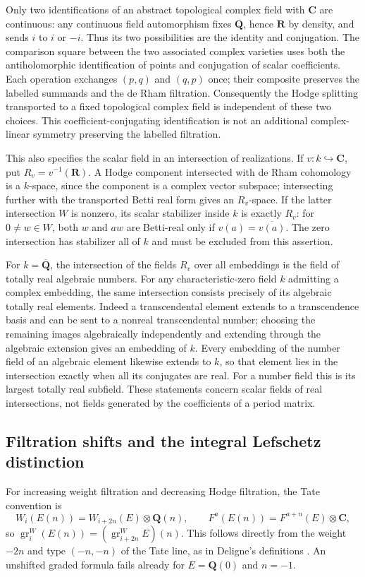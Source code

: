 \documentclass[11pt]{article}
\theoremstyle{definition}\newtheorem{definition}[theorem]{Definition}
\theoremstyle{remark}\newtheorem{remark}[theorem]{Remark}
\newcommand{\Q}{\mathbf Q}\newcommand{\Z}{\mathbf Z}
\newcommand{\R}{\mathbf R}\newcommand{\C}{\mathbf C}
\newcommand{\Qb}{\overline{\mathbf Q}}\newcommand{\Fp}{\mathbf F_p}
\DeclareMathOperator{\gr}{gr}\DeclareMathOperator{\GL}{GL}
\begin{document}
Only two identifications of an abstract topological complex field with $\C$ are continuous: any continuous field automorphism fixes $\Q$, hence $\R$ by density, and sends $i$ to $i$ or $-i$. Thus its two possibilities are the identity and conjugation. The comparison square between the two associated complex varieties uses both the antiholomorphic identification of points and conjugation of scalar coefficients. Each operation exchanges $(p,q)$ and $(q,p)$ once; their composite preserves the labelled summands and the de Rham filtration. Consequently the Hodge splitting transported to a fixed topological complex field is independent of these two choices. This coefficient-conjugating identification is not an additional complex-linear symmetry preserving the labelled filtration.

This also specifies the scalar field in an intersection of realizations. If $v:k\hookrightarrow\C$, put $R_v=v^{-1}(\R)$. A Hodge component intersected with de Rham cohomology is a $k$-space, since the component is a complex vector subspace; intersecting further with the transported Betti real form gives an $R_v$-space. If the latter intersection $W$ is nonzero, its scalar stabilizer inside $k$ is exactly $R_v$: for $0\ne w\in W$, both $w$ and $aw$ are Betti-real only if $v(a)=\overline{v(a)}$. The zero intersection has stabilizer all of $k$ and must be excluded from this assertion.

For $k=\Qb$, the intersection of the fields $R_v$ over all embeddings is the field of totally real algebraic numbers. For any characteristic-zero field $k$ admitting a complex embedding, the same intersection consists precisely of its algebraic totally real elements. Indeed a transcendental element extends to a transcendence basis and can be sent to a nonreal transcendental number; choosing the remaining images algebraically independently and extending through the algebraic extension gives an embedding of $k$. Every embedding of the number field of an algebraic element likewise extends to $k$, so that element lies in the intersection exactly when all its conjugates are real. For a number field this is its largest totally real subfield. These statements concern scalar fields of real intersections, not fields generated by the coefficients of a period matrix.


\subsection{Filtration shifts and the integral Lefschetz distinction}
For increasing weight filtration and decreasing Hodge filtration, the Tate convention is
\[
 W_i(E(n))=W_{i+2n}(E)\otimes\Q(n),\qquad
 F^a(E(n))=F^{a+n}(E)\otimes\C,
\]
so $\gr_i^W(E(n))=(\gr_{i+2n}^WE)(n)$. This follows directly from the weight $-2n$ and type $(-n,-n)$ of the Tate line, as in Deligne's definitions \cite[(2.1.13)--(2.1.14), pp.~26--27]{DeligneHodgeII}. An unshifted graded formula fails already for $E=\Q(0)$ and $n=-1$.
\end{document}
